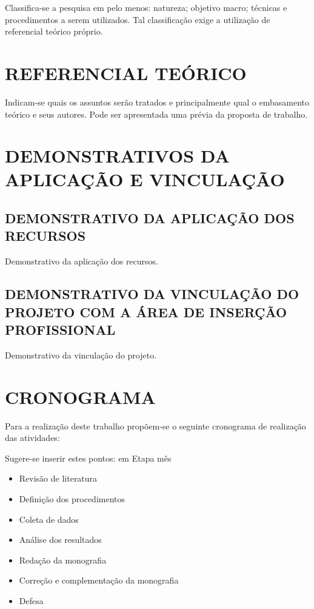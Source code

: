 \documentclass[
	12pt,				%
	openright,			%
	oneside,			%
	a4paper,			%
	chapter=TITLE,		%
	english,			%
	french,				%
	spanish,			%
	brazil				%
	]{abntex2}
\begin{document}
{{Classifica-se a pesquisa em pelo menos: natureza; objetivo macro; técnicas e procedimentos a serem utilizados. Tal classificação exige a utilização de referencial teórico próprio.



{\vspace{5em}\let\clearpage\relax \chapter[REFERENCIAL TEÓRICO]{	\textbf{REFERENCIAL TEÓRICO}}}

Indicam-se quais os assuntos serão tratados e principalmente qual o embasamento teórico e seus autores. Pode ser apresentada uma prévia da proposta de trabalho.


{\vspace{5em}\let\clearpage\relax \chapter[DEMONSTRATIVOS DA APLICAÇÃO E VINCULAÇÃO]{\textbf{DEMONSTRATIVOS DA APLICAÇÃO E VINCULAÇÃO}}}
\vspace{-1em}


\section[APLICAÇÃO]{DEMONSTRATIVO DA APLICAÇÃO DOS RECURSOS}

Demonstrativo da aplicação dos recursos.

\section[VINCULAÇÃO DO PROJETO]{DEMONSTRATIVO DA VINCULAÇÃO DO PROJETO COM A ÁREA DE INSERÇÃO PROFISSIONAL}

Demonstrativo da vinculação do projeto.


{\vspace{5em}\let\clearpage\relax \chapter[CRONOGRAMA]{\textbf{CRONOGRAMA}}}

Para a realização deste trabalho propõem-se o seguinte cronograma de realização das atividades:

Sugere-se inserir estes pontos: em Etapa mês
\begin{itemize}
\item Revisão de literatura
\item Definição dos procedimentos
\item Coleta de dados
\item Análise dos resultados
\item Redação da monografia
\item Correção e complementação da monografia
\item  Defesa
\end{itemize}

}}
\end{document}
